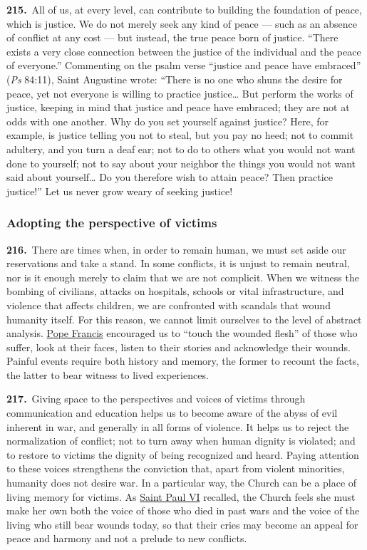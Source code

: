\documentclass{article}
\begin{document}
\textbf{215.}\ All of us, at every level, can contribute to building the foundation of peace, which is justice. We do not merely seek any kind of peace --- such as an absence of conflict at any cost --- but instead, the true peace born of justice. ``There exists a very close connection between the justice of the individual and the peace of everyone.''\cite{n190} Commenting on the psalm verse ``justice and peace have embraced'' (\emph{Ps} 84:11), Saint Augustine wrote: ``There is no one who shuns the desire for peace, yet not everyone is willing to practice justice\dots{} But perform the works of justice, keeping in mind that justice and peace have embraced; they are not at odds with one another. Why do you set yourself against justice? Here, for example, is justice telling you not to steal, but you pay no heed; not to commit adultery, and you turn a deaf ear; not to do to others what you would not want done to yourself; not to say about your neighbor the things you would not want said about yourself\dots{} Do you therefore wish to attain peace? Then practice justice!''\cite{n191} Let us never grow weary of seeking justice!

\subsubsection{Adopting the perspective of victims}

\textbf{216.}\ There are times when, in order to remain human, we must set aside our reservations and take a stand. In some conflicts, it is unjust to remain neutral, nor is it enough merely to claim that we are not complicit.\cite{n192} When we witness the bombing of civilians, attacks on hospitals, schools or vital infrastructure, and violence that affects children, we are confronted with scandals that wound humanity itself. For this reason, we cannot limit ourselves to the level of abstract analysis. \href{https://www.vatican.va/content/francesco/en.html}{Pope Francis} encouraged us to ``touch the wounded flesh''\cite{n193} of those who suffer, look at their faces, listen to their stories and acknowledge their wounds. Painful events require both history and memory, the former to recount the facts, the latter to bear witness to lived experiences.

\textbf{217.}\ Giving space to the perspectives and voices of victims through communication and education helps us to become aware of the abyss of evil inherent in war, and generally in all forms of violence. It helps us to reject the normalization of conflict; not to turn away when human dignity is violated; and to restore to victims the dignity of being recognized and heard.\cite{n194} Paying attention to these voices strengthens the conviction that, apart from violent minorities, humanity does not desire war. In a particular way, the Church can be a place of living memory for victims. As \href{https://www.vatican.va/content/paul-vi/en.html}{Saint Paul VI} recalled, the Church feels she must make her own both the voice of those who died in past wars and the voice of the living who still bear wounds today, so that their cries may become an appeal for peace and harmony and not a prelude to new conflicts.\cite{n195}
\end{document}
